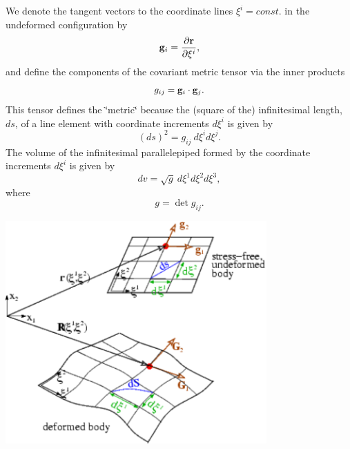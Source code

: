 We denote the tangent vectors to the coordinate lines $ \xi^i = const.$ in the undeformed configuration by \[ {\bf g}_i = \frac{\partial {\bf r}}{\partial \xi^i}, \] and define the components of the covariant metric tensor via the inner products \[ g_{ij} = {\bf g}_i \cdot {\bf g}_j. \] This tensor defines the \char`\"{}metric\char`\"{} because the (square of the) infinitesimal length, $ ds $, of a line element with coordinate increments $ d\xi^i$ is given by \[ (ds)^2 = g_{ij} \ d\xi^i d\xi^j. \] The volume of the infinitesimal parallelepiped formed by the coordinate increments $ d\xi^i$ is given by \[ dv = \sqrt{g} \ d\xi^1 d\xi^2 d\xi^3, \] where \[ g = \det g_{ij}. \]  
\begin{DoxyImage}
\includegraphics[width=0.75\textwidth]{Lagrangian_coord}
\end{DoxyImage}


